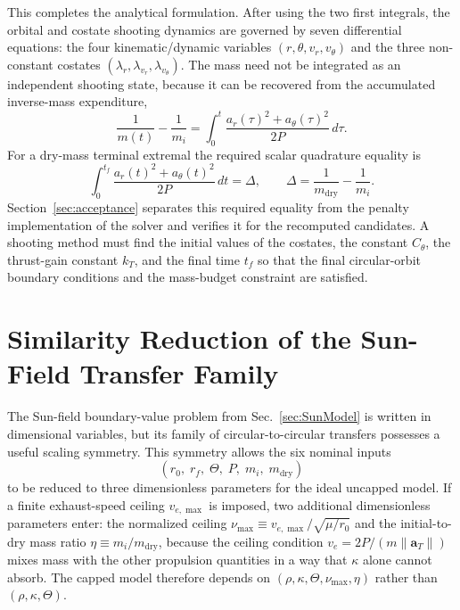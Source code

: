 \documentclass[journal,a4paper]{IEEEtran}
\begin{document}
\medskip
This completes the analytical formulation. After using the two first integrals, the orbital and costate shooting dynamics are governed by seven differential equations: the four kinematic/dynamic variables
\((r,\theta,v_r,v_\theta)\) and the three non-constant costates
\((\lambda_r,\lambda_{v_r},\lambda_{v_\theta})\). The mass need not be integrated as an independent shooting state, because it can be recovered from the accumulated inverse-mass expenditure,
\begin{equation}
    \frac{1}{m(t)}-\frac{1}{m_i}
    =
    \int_0^t
    \frac{a_r(\tau)^2+a_\theta(\tau)^2}{2P}
    \,d\tau .
    \label{eq:mass_quadrature_sun}
\end{equation}
For a dry-mass terminal extremal the required scalar quadrature equality is
\begin{equation}
    \int_0^{t_f}
    \frac{a_r(t)^2+a_\theta(t)^2}{2P}
    \,dt
    =
    \Delta,
    \qquad
    \Delta
    =
    \frac{1}{m_\mathrm{dry}}-\frac{1}{m_i}.
    \label{eq:dry_mass_quadrature_constraint}
\end{equation}
Section~\ref{sec:acceptance} separates this required equality from the penalty implementation of the solver and verifies it for the recomputed candidates. A shooting method must find the initial values of the costates, the constant \(C_\theta\), the thrust-gain constant \(k_T\), and the final time \(t_f\) so that the final circular-orbit boundary conditions and the mass-budget constraint are satisfied.

\section{Similarity Reduction of the Sun-Field Transfer Family}
\label{sec:similarity_reduction}

The Sun-field boundary-value problem from Sec.~\ref{sec:SunModel} is written in dimensional variables, but its family of circular-to-circular transfers possesses a useful scaling symmetry.
This symmetry allows the six nominal inputs
\[
(r_0,\; r_f,\; \Theta,\; P,\; m_i,\; m_\mathrm{dry})
\]
to be reduced to three dimensionless parameters for the ideal uncapped model. If a finite exhaust-speed ceiling \(v_{e,\max}\) is imposed, two additional dimensionless parameters enter: the normalized ceiling \(\nu_{\max}\equiv v_{e,\max}/\sqrt{\mu/r_0}\) and the initial-to-dry mass ratio \(\eta\equiv m_i/m_\mathrm{dry}\), because the ceiling condition \(v_e=2P/(m\|\mathbf{a}_T\|)\) mixes mass with the other propulsion quantities in a way that \(\kappa\) alone cannot absorb. The capped model therefore depends on \((\rho,\kappa,\Theta,\nu_{\max},\eta)\) rather than \((\rho,\kappa,\Theta)\).
\end{document}
